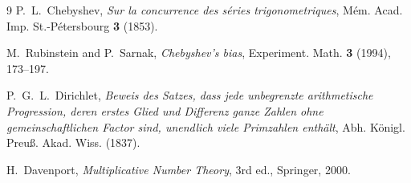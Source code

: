 \begin{thebibliography}{9}
P.~L.~Chebyshev,
\emph{Sur la concurrence des séries trigonometriques},
Mém. Acad. Imp. St.-Pétersbourg \textbf{3} (1853).

M.~Rubinstein and P.~Sarnak,
\emph{Chebyshev's bias},
Experiment. Math. \textbf{3} (1994), 173--197.

P.~G.~L.~Dirichlet,
\emph{Beweis des Satzes, dass jede unbegrenzte arithmetische Progression,
deren erstes Glied und Differenz ganze Zahlen ohne gemeinschaftlichen
Factor sind, unendlich viele Primzahlen enthält},
Abh. Königl. Preuß. Akad. Wiss. (1837).

H.~Davenport,
\emph{Multiplicative Number Theory},
3rd ed., Springer, 2000.
\end{thebibliography}

